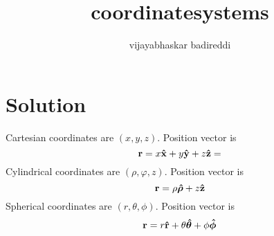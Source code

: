 \documentclass[12pt]{article}
\title{coordinatesystems}
\author{vijayabhaskar badireddi}
\begin{document}
\section*{Solution}
Cartesian coordinates are $(x,y,z)$. Position vector is \[\vb{r}=x\vu{x}+y\vu{y}+z\vu{z}=\]
Cylindrical coordinates are $(\rho,\varphi,z)$. Position vector is \[\vb{r}=\rho\vu{\bm{\rho}}+z\vu{z}\]
Spherical coordinates are $(r,\theta,\phi)$. Position vector is 
\[\vb{r}=r\vu{r}+\theta\vu{\bm{\theta}}+\phi\vu{\bm{\phi}}\]
\end{document}
